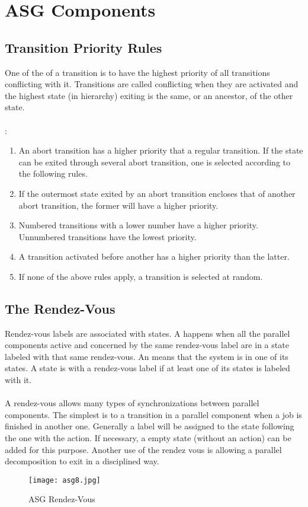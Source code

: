 \documentclass[../main.tex]{subfiles}
\begin{document}
\section{ASG Components}

\subsection{Transition Priority Rules}
One of the  of a transition is to have the highest priority of all transitions conflicting  with it. Transitions are called conflicting when they are activated and the highest state (in hierarchy) exiting is the same, or an ancestor, of the other state.
\\\\
:
\begin{enumerate}
	\item An abort transition has a higher priority that a regular transition. If the state can be exited through several abort transition, one is selected according to the following rules.
	\item If the outermost state exited by an abort transition encloses that of another abort transition, the former will have a higher priority.
	\item Numbered transitions with a lower number have a higher priority. Unnumbered transitions have the lowest priority.
	\item A transition activated before another has a higher priority than the latter.
	\item If none of the above rules apply, a transition is selected at random.
\end{enumerate}

\subsection{The Rendez-Vous}
Rendez-vous labels are associated with states.
A  happens when all the parallel components active and concerned by the same rendez-vous label are in a state labeled with that same rendez-vous.
An  means that the system is in one of its states.
A state is  with a rendez-vous label if at least one of its states is labeled with it.
\\\\
A rendez-vous allows many types of synchronizations between parallel components.
The simplest is to  a transition in a parallel component when a job is finished in another one.
Generally a label will be assigned to the state following the one with the action.
If necessary, a empty state (without an action) can be added for this purpose.
Another use of the rendez vous is allowing a parallel decomposition to exit in a disciplined way.
\begin{figure}[H]
    \centering
    \texttt{[image: asg8.jpg]}
    \caption{ASG Rendez-Vous}
    \label{asg8}
\end{figure}
\end{document}
